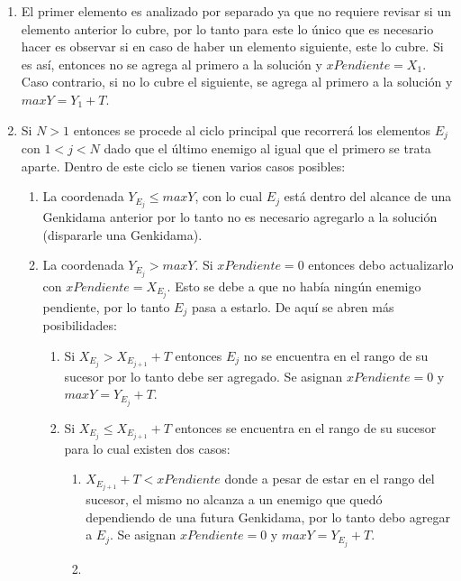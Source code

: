 	\begin{enumerate}
		\item{
			El primer elemento es analizado por separado ya que no requiere
			revisar si un elemento anterior lo cubre, por lo tanto para este lo
			único que es necesario hacer es observar si en caso de haber un elemento
			siguiente, este lo cubre. Si es así, entonces no se agrega al primero a
			la solución y $xPendiente = X_1$. Caso contrario, si no lo cubre el
			siguiente, se agrega al primero a la solución y $maxY = Y_1 +
			T$.\label{ej2_imp:caso_base}
		}

		\item{
			Si $N > 1$ entonces se procede al ciclo principal que recorrerá los
			elementos $E_j$ con $1 < j < N$ dado que el último enemigo al igual
			que el primero se trata aparte. Dentro de este ciclo se tienen
			varios casos posibles:
			\begin{enumerate}
				\item{
					\label{ej2_imp:caso_y_max}
					La coordenada $Y_{E_j} \leq maxY$, con lo cual $E_j$ está
					dentro del alcance de una Genkidama anterior por lo tanto no
					es necesario agregarlo a la solución (dispararle una
					Genkidama).
				}
				\item{
					La coordenada $Y_{E_j} > maxY$. Si $xPendiente = 0$ entonces
					debo actualizarlo con $xPendiente = X_{E_j}$. Esto se debe a
					que no había ningún enemigo pendiente, por lo tanto $E_j$
					pasa a estarlo. De aquí se abren más posibilidades:
					\begin{enumerate}
						\item{
							\label{ej2_imp:caso_no_cubierto}
							Si $X_{E_j} > X_{E_{j+1}} + T$ entonces $E_j$ no
							se encuentra en el rango de su sucesor por lo tanto
							debe ser agregado. Se asignan $xPendiente = 0$ y
							$maxY = Y_{E_j} + T$.
						}
						\item{
							Si $X_{E_j} \leq X_{E_{j+1}} + T$ entonces se
							encuentra en el rango de su sucesor para lo cual
							existen dos casos:
							\begin{enumerate}
								\item{
									\label{ej2_imp:caso_no_cubierto_pendiente}
									$X_{E_{j+1}} + T < xPendiente$ donde a pesar
									de estar en el rango del sucesor, el mismo no
									alcanza a un enemigo que quedó dependiendo de
									una futura Genkidama, por lo tanto debo agregar
									a $E_j$. Se asignan $xPendiente = 0$ y $maxY = Y_{E_j} + T$.
								}
								\item{
}
\end{enumerate}}
\end{enumerate}}
\end{enumerate}}
\end{enumerate}

